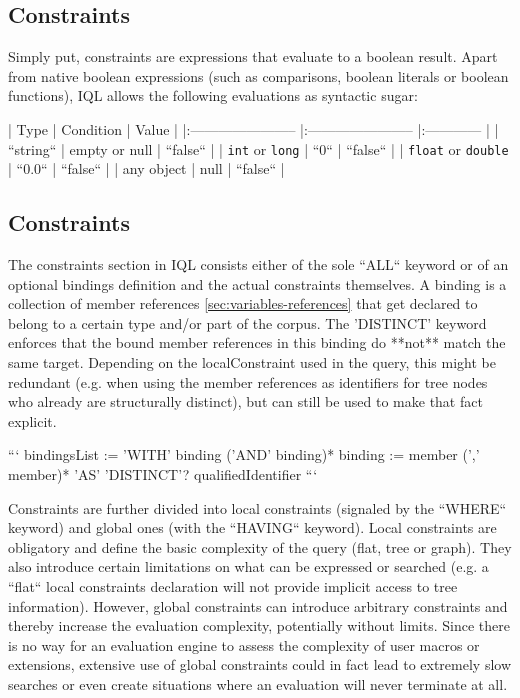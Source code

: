 \documentclass[11pt]{article}
\begin{document}
\subsection{Constraints}
\label{sec:constraints}

Simply put, constraints are expressions that evaluate to a boolean result. Apart from native boolean expressions (such as comparisons, boolean literals or boolean functions), IQL allows the following evaluations as syntactic sugar:

|      Type               |       Condition         |    Value     |
|:----------------------- |:----------------------- |:------------ |
| ``string``              | empty or null           | ``false``    | 
| \texttt{int} or \texttt{long}     | ``0``                   | ``false``    |
| \texttt{float} or \texttt{double} | ``0.0``                 | ``false``    |
| any object              | null                    | ``false``    |


\subsection{Constraints}
\label{sec:constraints}

The constraints section in IQL consists either of the sole ``ALL`` keyword or of an optional bindings definition and the actual constraints themselves. A binding is a collection of member references \cref{sec:variables-references} that get declared to belong to a certain type and/or part of the corpus. The 'DISTINCT' keyword enforces that the bound member references in this binding do **not** match the same target. Depending on the localConstraint used in the query, this might be redundant (e.g. when using the member references as identifiers for tree nodes who already are structurally distinct), but can still be used to make that fact explicit. 

```
bindingsList := 'WITH' binding ('AND' binding)* 
binding := member (',' member)* 'AS' 'DISTINCT'? qualifiedIdentifier
```

Constraints are further divided into local constraints (signaled by the ``WHERE`` keyword) and global ones (with the ``HAVING`` keyword). Local constraints are obligatory and define the basic complexity of the query (flat, tree or graph). They also introduce certain limitations on what can be expressed or searched (e.g. a ``flat`` local constraints declaration will not provide implicit access to tree information). However, global constraints can introduce arbitrary constraints and thereby increase the evaluation complexity, potentially without limits. Since there is no way for an evaluation engine to assess the complexity of user macros or extensions, extensive use of global constraints could in fact lead to extremely slow searches or even create situations where an evaluation will never terminate at all.
\end{document}
